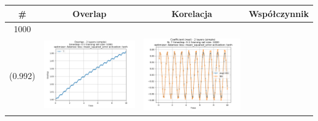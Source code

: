\documentclass{article}
\begin{document}
\begin{tabular}{|c|c|c|c|} \hline
     \# & Overlap & Korelacja & Współczynnik  \\ \hline
     1000 \\ (0.992) &
     \includegraphics[scale=0.37]{./Searching_for_good_train_set_size/2_layers_simple_train_samples=1000_timestep=0.1_t_total=10.0_optimizer=Adamax_loss=mean_squared_error_activation=tanh/Overlap.png} &
     \includegraphics[scale=0.37]{./Searching_for_good_train_set_size/2_layers_simple_train_samples=1000_timestep=0.1_t_total=10.0_optimizer=Adamax_loss=mean_squared_error_activation=tanh/Coeff_N=7_(real).png} &

\end{tabular}
\end{document}
